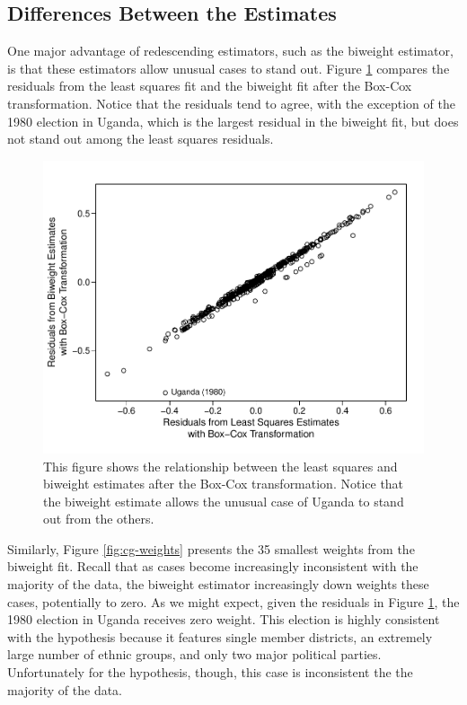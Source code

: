 \documentclass[12pt]{article}
\begin{document}
\subsection*{Differences Between the Estimates}

One major advantage of redescending estimators, such as the biweight estimator, is that these estimators allow unusual cases to stand out. Figure \ref{fig:cg-residuals-compare} compares the residuals from the least squares fit and the biweight fit after the Box-Cox transformation. Notice that the residuals tend to agree, with the exception of the 1980 election in Uganda, which is the largest residual in the biweight fit, but does not stand out among the least squares residuals.

\begin{figure}[h!]
\begin{center}
\includegraphics[scale = 0.8]{figs/cg-residuals-compare.pdf}
\caption{This figure shows the relationship between the least squares and biweight estimates after the Box-Cox transformation. Notice that the biweight estimate allows the unusual case of Uganda to stand out from the others.}\label{fig:cg-residuals-compare}
\end{center}
\end{figure}

Similarly, Figure \ref{fig:cg-weights} presents the 35 smallest weights from the biweight fit. Recall that as cases become increasingly inconsistent with the majority of the data, the biweight estimator increasingly down weights these cases, potentially to zero. As we might expect, given the residuals in Figure \ref{fig:cg-residuals-compare}, the 1980 election in Uganda receives zero weight. This election is highly consistent with the hypothesis because it features single member districts, an extremely large number of ethnic groups, and only two major political parties. Unfortunately for the hypothesis, though, this case is inconsistent the the majority of the data.
\end{document}
